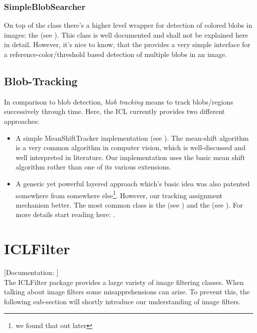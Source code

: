 \subsubsection{SimpleBlobSearcher}

On top of the  class there's a higher level wrapper for detection of colored blobs in images: the  (see ). This class is well documented and shall not be explained here in detail. However, it's nice to know, that the  provides a very simple interface for a reference-color/threshold based detection of multiple blobs in an image.

\subsection{Blob-Tracking}

In comparison to blob detection, \emph{blob tracking} means to track blobs/regions successively through time. Here, the ICL currently provides two different approaches: 
\begin{itemize}
\item A simple MeanShiftTracker implementation (see ). The mean-shift algorithm is a very common algorithm in computer vision, which is well-discussed and well interpreted in literature. Our implementation uses the basic mean shift algorithm rather than one of its various extensions.
\item A generic yet powerful layered approach which's basic idea was also patented somewhere from somewhere else\footnote{we found that out later}. However, our tracking assignment mechanism better. The most common class is the  (see ) and the  (see ). For more details start reading here: .
\end{itemize}


\section{ICLFilter\label{sec:filter}}

[Documentation: ]\\

The ICLFilter package provides a large variety of image filtering classes. When talking about image filters some misapprehensions can arise. To prevent this, the following sub-section will shortly introduce our understanding of image filters.

